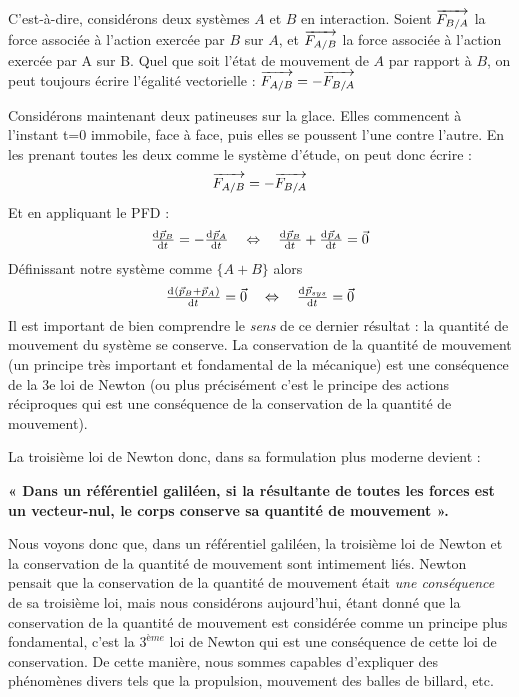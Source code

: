 \documentclass[11pt,a4paper]{article}
\begin{document}
C’est-à-dire, considérons deux systèmes $A$ et $B$ en interaction.  Soient $\overrightarrow{F_{B/A}}$ la force associée à l’action exercée par $B$ sur $A$, et $\overrightarrow{F_{A/B}}$  la force associée à l’action exercée par A sur B.  Quel que soit l’état de mouvement de $A$ par rapport à $B$, on peut toujours écrire l’égalité vectorielle :  $ \overrightarrow{F_{A/B}} = - \overrightarrow{F_{B/A}}$

Considérons maintenant deux patineuses sur la glace.  Elles commencent à l’instant t=0 immobile, face à face, puis elles se poussent l’une contre l’autre. En les prenant toutes les deux comme le système d’étude,  on peut donc écrire : 
$$ \overrightarrow{F_{A/B}} = - \overrightarrow{F_{B/A}} $$  
Et en appliquant le PFD : 
\[ \od{\vp_B}{t} = -\od{\vp_A}{t} \quad \Leftrightarrow \quad \od{\vp_B}{t} + \od{\vp_A}{t} = \vec{0}\]
Définissant notre système comme $\{ A + B \}$ alors 
\[ \od{( \vp_B + \vp_A )}{t} = \vec{0}  \quad \Leftrightarrow \quad \od{\vp_{sys}}{t} = \vec{0} \]
Il est important de bien comprendre le \textit{sens} de ce dernier résultat : la quantité de mouvement du système se conserve. La conservation de la quantité de mouvement (un principe très important et fondamental de la mécanique) est une conséquence de la 3e loi de Newton (ou plus précisément c’est le principe des actions réciproques qui est une conséquence de la conservation de la quantité de mouvement). 

La troisième loi de Newton donc, dans sa formulation plus moderne devient : 
\begin{shaded}
\textbf{« Dans un référentiel galiléen, si la résultante de toutes les forces est un vecteur-nul, le corps conserve sa quantité de mouvement ». }
\end{shaded}

\begin{rmrq}
Nous voyons donc que, dans un référentiel galiléen, la troisième loi de Newton et la conservation de la quantité de mouvement sont intimement liés. Newton pensait que la conservation de la quantité de mouvement était \emph{une conséquence} de sa troisième loi, mais nous considérons aujourd’hui, étant donné que la conservation de la quantité de mouvement est considérée comme un principe plus fondamental, c’est la $3^{ème}$ loi de Newton qui est une conséquence de cette loi de conservation. De cette manière, nous sommes capables d’expliquer des phénomènes divers tels que la propulsion, mouvement des balles de billard, etc. 
\end{rmrq}
\end{document}
